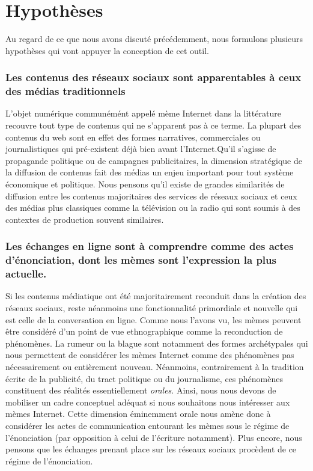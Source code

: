 \section{Hypothèses}

Au regard de ce que nous avons discuté précédemment, nous formulons plusieurs hypothèses qui  vont appuyer la conception de cet outil.

\subsubsection{Les contenus des réseaux sociaux sont apparentables à ceux des médias traditionnels} 

L'objet numérique communémént appelé mème Internet dans la littérature recouvre tout type de contenus qui ne s'apparent pas à ce terme. La plupart des contenus du web sont en effet des formes narratives, commerciales ou journalistiques qui pré-existent déjà bien avant l'Internet.Qu{\textquoteright}il s{\textquoteright}agisse de propagande politique ou de campagnes publicitaires, la dimension stratégique de la diffusion de contenus fait des médias un enjeu important pour tout système économique et politique. Nous pensons qu{\textquoteright}il existe de grandes similarités de diffusion entre les contenus majoritaires des services de réseaux sociaux et ceux des médias plus classiques comme la télévision ou la radio qui sont soumis à des contextes de production souvent similaires.

\subsubsection{Les échanges en ligne sont à comprendre comme des actes d'énonciation, dont les mèmes sont l'expression la plus actuelle.}

Si les contenus médiatique ont été majoritairement reconduit dans la création des réseaux sociaux, reste néanmoins une fonctionnalité primordiale et nouvelle qui est celle de la conversation en ligne. Comme nous l'avons vu, les mèmes peuvent être considéré d'un point de vue ethnographique comme la reconduction de phénomènes. La rumeur ou la blague sont notamment des formes archétypales qui nous permettent de considérer les mèmes Internet comme des phénomènes pas nécessairement ou entièrement nouveau. Néanmoins, contrairement à la tradition écrite de la publicité, du tract politique ou du journalisme, ces phénomènes constituent des réalités essentiellement \textit{orales}. Ainsi, nous nous devons de mobiliser un cadre conceptuel adéquat si nous souhaitons nous intéresser aux mèmes Internet. Cette dimension éminemment orale nous amène donc à considérer les actes de communication entourant les mèmes sous le régime de l'énonciation (par opposition à celui de l'écriture notamment). Plus encore, nous pensons que les échanges prenant place sur les réseaux sociaux procèdent de ce régime de l'énonciation.


